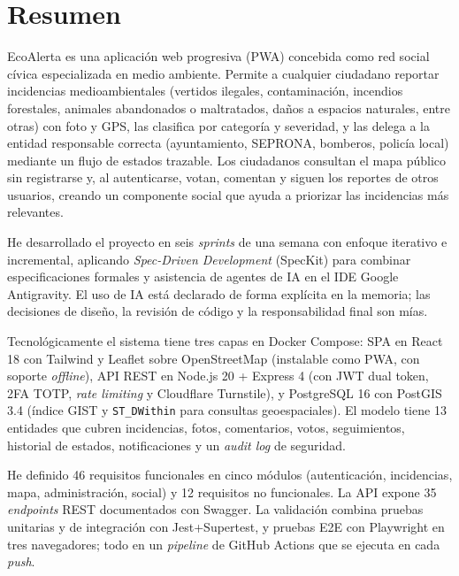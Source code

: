 
\chapter*{Resumen}
\label{ch:resumen}

EcoAlerta es una aplicación web progresiva (PWA) concebida como red social cívica especializada en medio ambiente. Permite a cualquier ciudadano reportar incidencias medioambientales (vertidos ilegales, contaminación, incendios forestales, animales abandonados o maltratados, daños a espacios naturales, entre otras) con foto y GPS, las clasifica por categoría y severidad, y las delega a la entidad responsable correcta (ayuntamiento, SEPRONA, bomberos, policía local) mediante un flujo de estados trazable. Los ciudadanos consultan el mapa público sin registrarse y, al autenticarse, votan, comentan y siguen los reportes de otros usuarios, creando un componente social que ayuda a priorizar las incidencias más relevantes.

He desarrollado el proyecto en seis \textit{sprints} de una semana con enfoque iterativo e incremental, aplicando \textit{Spec-Driven Development} (SpecKit) para combinar especificaciones formales y asistencia de agentes de IA en el IDE Google Antigravity. El uso de IA está declarado de forma explícita en la memoria; las decisiones de diseño, la revisión de código y la responsabilidad final son mías.

Tecnológicamente el sistema tiene tres capas en Docker Compose: SPA en React 18 con Tailwind y Leaflet sobre OpenStreetMap (instalable como PWA, con soporte \textit{offline}), API REST en Node.js 20 + Express 4 (con JWT dual token, 2FA TOTP, \textit{rate limiting} y Cloudflare Turnstile), y PostgreSQL 16 con PostGIS 3.4 (índice GIST y \texttt{ST\_DWithin} para consultas geoespaciales). El modelo tiene 13 entidades que cubren incidencias, fotos, comentarios, votos, seguimientos, historial de estados, notificaciones y un \textit{audit log} de seguridad.

He definido 46 requisitos funcionales en cinco módulos (autenticación, incidencias, mapa, administración, social) y 12 requisitos no funcionales. La API expone 35 \textit{endpoints} REST documentados con Swagger. La validación combina pruebas unitarias y de integración con Jest+Supertest, y pruebas E2E con Playwright en tres navegadores; todo en un \textit{pipeline} de GitHub Actions que se ejecuta en cada \textit{push}.

